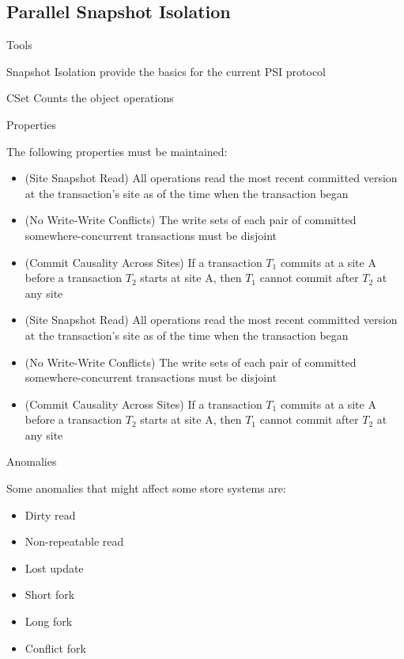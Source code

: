 \documentclass{beamer}
\begin{document}
	\subsection{Parallel Snapshot Isolation}
		\begin{frame}{Tools}
		
		
			Snapshot Isolation provide the basics for the current PSI protocol
			
			CSet Counts the object operations
		
		\end{frame}
		
		\begin{frame}{Properties}
		
		The following properties must be maintained:		
		\begin{itemize}
		\item (Site Snapshot Read) All operations read the most recent committed version at the transaction's site as of the time when the transaction began
		\item (No Write-Write Conflicts) The write sets of each pair of committed somewhere-concurrent transactions must be disjoint
		\item (Commit Causality Across Sites) If a transaction $T_{1}$ commits at a site A before a transaction $T_{2}$ starts at site A, then $T_{1}$ cannot commit after $T_{2}$ at any site
		\end{itemize}		
		
		\begin{itemize}
		\item (Site Snapshot Read) All operations read the most recent committed version at the transaction's site as of the time when the transaction began
		\item (No Write-Write Conflicts) The write sets of each pair of committed somewhere-concurrent transactions must be disjoint
		\item (Commit Causality Across Sites) If a transaction $T_{1}$ commits at a site A before a transaction $T_{2}$ starts at site A, then $T_{1}$ cannot commit after $T_{2}$ at any site
		\end{itemize}
		
		\end{frame}	

		\begin{frame}{Anomalies}
		
		Some anomalies that might affect some store systems are:
		\begin{itemize}
		\item Dirty read
		\item Non-repeatable read
		\item Lost update
		\item Short fork
		\item Long fork
		\item Conflict fork
		\end{itemize}		
		
		\end{frame}
\end{document}
